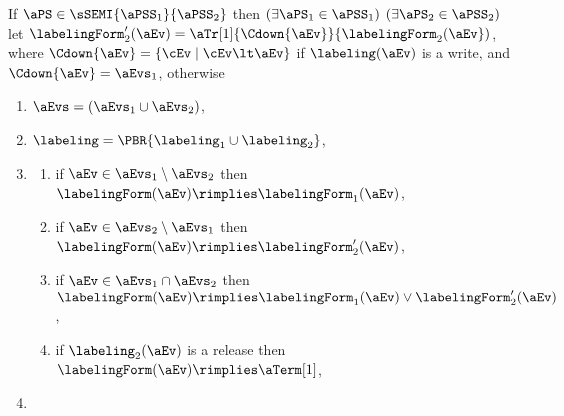 \begin{definition}
  \noindent
  If $\aPS \in \sSEMI{\aPSS_1}{\aPSS_2}$ then $(\exists\aPS_1\in\aPSS_1)$
  $(\exists\aPS_2\in\aPSS_2)$
  \\
  let $\labelingForm'_2(\aEv)=\aTr[1]{\Cdown{\aEv}}{\labelingForm_2(\aEv})$,
  where $\Cdown{\aEv}=\{ \cEv \mid \cEv \lt \aEv \}$ if $\labeling(\aEv)$ is
  a write, and $\Cdown{\aEv}=\aEvs_1$, otherwise
  \begin{multicols}{2}
    \begin{enumerate}[topsep=0pt,label=(\textsc{s}\arabic*),ref=\textsc{s}\arabic*]
    \item \label{seq-E}
      $\aEvs = (\aEvs_1\cup\aEvs_2)$,
    \item \label{seq-lambda}
      ${\labeling}=\PBR{{\labeling_1}\cup {\labeling_2}}$, 
    \item[] \label{par-kappa}
      \begin{enumerate}[leftmargin=0pt]
      \item \label{seq-kappa1}
        if $\aEv\in\aEvs_1\setminus\aEvs_2$ then $\labelingForm(\aEv) \rimplies \labelingForm_1(\aEv)$,
      \item \label{seq-kappa2}
        if $\aEv\in\aEvs_2\setminus\aEvs_1$ then $\labelingForm(\aEv) \rimplies \labelingForm'_2(\aEv)$,
      \item \label{seq-kappa12}
        if $\aEv\in\aEvs_1\cap\aEvs_2$ then $\labelingForm(\aEv) \rimplies \labelingForm_1(\aEv)\lor\labelingForm'_2(\aEv)$,
      \item \label{seq-kappa-release}
        if $\labeling_2(\aEv)$ is a release then $\labelingForm(\aEv) \rimplies \aTerm[1]$,
      \end{enumerate}
    \item \label{seq-tau}

\end{enumerate}
\end{multicols}
\end{definition}
